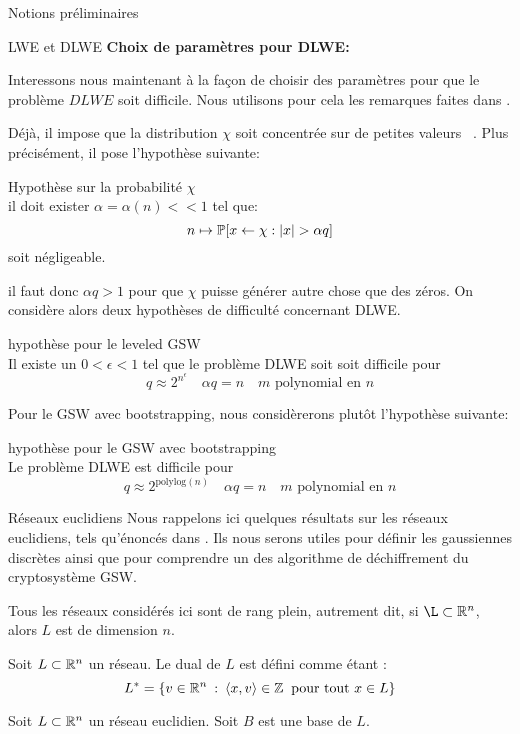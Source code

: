 \begin{section}{Notions préliminaires}
\begin{subsection}{LWE et DLWE}
	\textbf{Choix de paramètres pour DLWE:}

	Interessons nous maintenant à la façon de choisir des paramètres
	pour que le problème $DLWE$ soit difficile. Nous utilisons pour cela 
	les remarques faites dans \cite{halevi}.

	Déjà, il impose que la distribution $\chi$ soit \og concentrée sur de
	petites valeurs \fg~. Plus précisément, il pose l'hypothèse suivante: 

	\begin{hyp}{Hypothèse sur la probabilité $\chi$}\\ \label{hyp:proba}
	il doit exister $\alpha = \alpha(n) << 1$ tel que:
	\[ n \mapsto \mathbb{P} [x \leftarrow \chi : |x| > \alpha q]\] 
	soit négligeable.
	\end{hyp}

	il faut donc $\alpha q > 1$ pour que $\chi$ puisse générer autre chose 
	que des zéros. 
	On considère alors deux hypothèses de difficulté 
	concernant DLWE. 

	\begin{hyp}{hypothèse pour le leveled GSW} \\
	\label{hyp_dlwe}
	Il existe un $0 < \epsilon < 1$ tel que le problème DLWE soit
	soit difficile pour 
	\[ q \approx 2^{n^\epsilon}\quad \alpha q = n\quad \text{$m$ polynomial en $n$}\]
	\end{hyp}

	Pour le GSW avec bootstrapping, nous considèrerons plutôt l'hypothèse
	suivante:
	\begin{hyp}{hypothèse pour le GSW avec bootstrapping} \\
	\label{hyp_dlwe_boot}
	Le problème DLWE est difficile pour 
	\[ q \approx 2^\text{polylog$(n)$}\quad \alpha q = n\quad \text{$m$ polynomial en $n$}\]
	\end{hyp}


	\end{subsection}
	\begin{subsection}{Réseaux euclidiens}
	Nous rappelons ici quelques résultats sur les réseaux euclidiens, tels qu'énoncés dans \cite{EC:MicPei12}. Ils nous serons utiles pour définir les gaussiennes discrètes ainsi que pour comprendre un des algorithme de déchiffrement du cryptosystème GSW.

	Tous les réseaux considérés ici sont de rang plein, autrement dit, si $\L \subset \RR^n$, alors $L$ est de dimension $n$.

	\begin{definition}
	Soit $L\subset \mathbb{R}^n$ un réseau. Le dual de $L$ est défini comme étant :
	\[ L^* = \{ v \in \mathbb{R}^n \::\: \langle x, v \rangle \in \mathbb{Z}
	   \:\text{ pour tout } x\in L\} \]
	\end{definition}
	\begin{prop} 
	Soit $L \subset \mathbb{R}^n$ un réseau euclidien. Soit $B$ est une base de $L$.
	

\end{prop}
\end{subsection}
\end{section}
